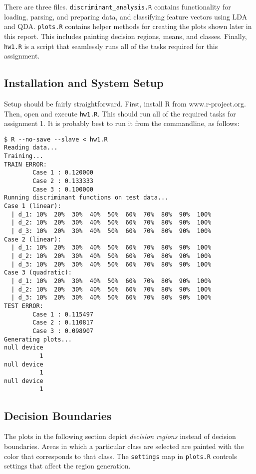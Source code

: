 \documentclass{article}
\begin{document}
There are three files. \verb|discriminant_analysis.R| contains functionality for loading,
parsing, and preparing data, and classifying feature vectors using LDA and QDA.
\verb|plots.R| contains helper methods for creating the plots shown later in this report.
This includes painting decision regions, means, and classes. Finally, \verb|hw1.R| is a
script that seamlessly runs all of the tasks required for this assignment.

\subsection{Installation and System Setup}

Setup should be fairly straightforward. First, install R from www.r-project.org. Then,
open and execute \verb|hw1.R|. This should run all of the required tasks for assignment
1. It is probably best to run it from the commandline, as follows:
\begin{verbatim}
$ R --no-save --slave < hw1.R
Reading data...
Training...
TRAIN ERROR:
        Case 1 : 0.120000
        Case 2 : 0.133333
        Case 3 : 0.100000
Running discriminant functions on test data...
Case 1 (linear):
  | d_1: 10%  20%  30%  40%  50%  60%  70%  80%  90%  100%
  | d_2: 10%  20%  30%  40%  50%  60%  70%  80%  90%  100%
  | d_3: 10%  20%  30%  40%  50%  60%  70%  80%  90%  100%
Case 2 (linear):
  | d_1: 10%  20%  30%  40%  50%  60%  70%  80%  90%  100%
  | d_2: 10%  20%  30%  40%  50%  60%  70%  80%  90%  100%
  | d_3: 10%  20%  30%  40%  50%  60%  70%  80%  90%  100%
Case 3 (quadratic):
  | d_1: 10%  20%  30%  40%  50%  60%  70%  80%  90%  100%
  | d_2: 10%  20%  30%  40%  50%  60%  70%  80%  90%  100%
  | d_3: 10%  20%  30%  40%  50%  60%  70%  80%  90%  100%
TEST ERROR:
        Case 1 : 0.115497
        Case 2 : 0.110817
        Case 3 : 0.098907
Generating plots...
null device
          1
null device
          1
null device
          1
\end{verbatim}

\subsection{Decision Boundaries}

The plots in the following section depict {\it decision regions} instead of
decision boundaries. Areas in which a particular class are selected are 
painted with the color that corresponds to that class. The \verb|settings|
map in \verb|plots.R| controls settings that affect the region generation.
\end{document}
